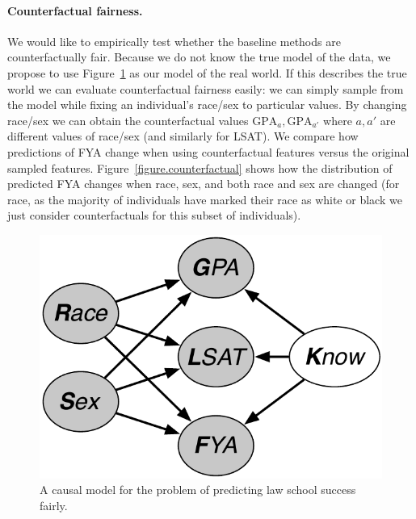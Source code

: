 \paragraph{Counterfactual fairness.}
We would like to empirically test whether the baseline methods are counterfactually fair. Because we do not know the true model of the data, we propose to use Figure~\ref{figure.law_school} as our model of the real world. If this describes the true world we can evaluate counterfactual fairness easily: we can simply sample from the model while fixing an individual's race/sex to particular values. By changing race/sex we can obtain the counterfactual values $\mbox{GPA}_a,\mbox{GPA}_{a'}$ where $a,a'$ are different values of race/sex (and similarly for LSAT). We compare how predictions of FYA change when using counterfactual features versus the original sampled features. Figure~\ref{figure.counterfactual} shows how the distribution of predicted FYA changes when race, sex, and both race and sex are changed (for race, as the majority of individuals have marked their race as white or black we just consider counterfactuals for this subset of individuals).


 


\begin{figure}[th]
\begin{center}
\vspace{-1ex}
\centerline{\includegraphics[width=0.8\columnwidth]{law_school_model}}
\vspace{-2ex}
\caption{A causal model for the problem of predicting law school success fairly.\label{figure.law_school}\vspace{-2ex}}
\vspace{-2ex}
\end{center}
\end{figure}


